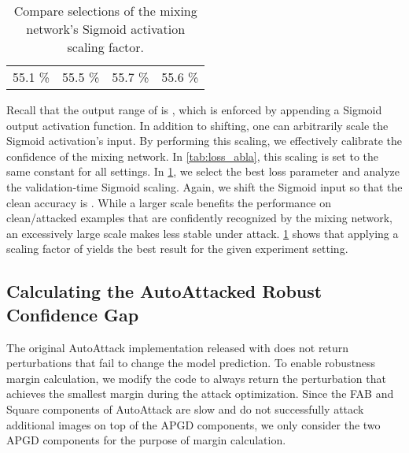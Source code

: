 \documentclass[11pt, letterpaper]{article}
\theoremstyle{plain}
\theoremstyle{definition}
\begin{document}
\begin{table}
\centering
\caption{Compare selections of the mixing network's Sigmoid activation scaling factor.}
\label{tab:scale_abla}
\begin{small}
\begin{tabular}{c|c|c|c}
	\toprule
	 &  &  &  \\
	\midrule
	55.1 \% & 55.5 \% & 55.7 \% & 55.6 \% \\
	\bottomrule
\end{tabular}
\end{small}
\end{table}

Recall that the output range of  is , which is enforced by appending a Sigmoid output activation function. In addition to shifting, one can arbitrarily scale the Sigmoid activation's input. By performing this scaling, we effectively calibrate the confidence of the mixing network. In \cref{tab:loss_abla}, this scaling is set to the same constant for all settings. In \cref{tab:scale_abla}, we select the best loss parameter and analyze the validation-time Sigmoid scaling. Again, we shift the Sigmoid input so that the clean accuracy is . While a larger scale benefits the performance on clean/attacked examples that are confidently recognized by the mixing network, an excessively large scale makes  less stable under attack. \cref{tab:scale_abla} shows that applying a scaling factor of  yields the best result for the given experiment setting.


\subsection{Calculating the AutoAttacked Robust Confidence Gap} \label{sec:autoattack_margin}

The original AutoAttack implementation released with \citep{Croce20a} does not return perturbations that fail to change the model prediction. To enable robustness margin calculation, we modify the code to always return the perturbation that achieves the smallest margin during the attack optimization. Since the FAB and Square components of AutoAttack are slow and do not successfully attack additional images on top of the APGD components, we only consider the two APGD components for the purpose of margin calculation.
\end{document}
